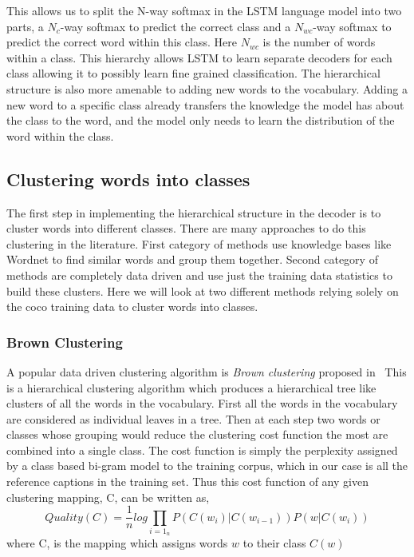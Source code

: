 This allows us to split the N-way softmax in the LSTM language model into two
parts, a $N_c$-way softmax to predict the correct class and a $N_{wc}$-way
softmax to predict the correct word within this class.
Here $N_{wc}$ is the number of words within a class.
This hierarchy allows LSTM to learn separate decoders for each class allowing it to
possibly learn fine grained classification.
The hierarchical structure is also more amenable to adding new words to the vocabulary.
Adding a new word to a specific class already transfers the knowledge the model
has about the class to the word, and the model only needs to learn the
distribution of the word within the class.

\subsection{Clustering words into classes}
The first step in implementing the hierarchical structure in the decoder is to
cluster words into different classes.
There are many approaches to do this clustering in the literature.
First category of methods use knowledge bases like Wordnet to find similar words
and group them together.
Second category of methods are completely data driven and use just the training
data statistics to build these clusters.
Here we will look at two different methods relying solely on the coco training
data to cluster words into classes.

\subsubsection{Brown Clustering}
A popular data driven clustering algorithm is \emph{Brown clustering} proposed
in~\cite{BrownClust}
This is a hierarchical clustering algorithm which produces a hierarchical tree
like clusters of all the words in the vocabulary.
First all the words in the vocabulary are considered as individual leaves in a
tree. 
Then at each step two words or classes whose grouping would reduce the clustering
cost function the most are combined into a single class.
The cost function is simply the perplexity assigned by a class based bi-gram
model to the training corpus, which in our case is all the reference captions in
the training set.
Thus this cost function of any given clustering mapping, C, can be written as,
\begin{equation}
  \label{eq:brown} 
        Quality(C) = \frac{1}{n}log \prod_{i=1}_{n} P(C(w_i)|C(w_{i-1})) P(w|C(w_i))
\end{equation}
\noindent where C, is the mapping which assigns words $w$ to their class $C(w)$

